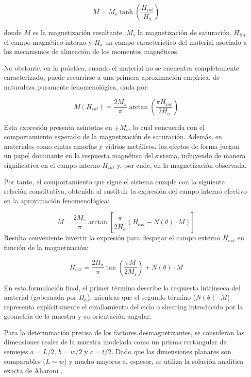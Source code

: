 $$ M = M_s \tanh\left( \frac{H_{int}}{H_a} \right) $$

donde $M$ es la magnetización resultante, $M_s$ la magnetización de saturación, $H_{int}$ el campo magnético interno y $H_a$ un campo característico del material asociado a los mecanismos de alineación de los momentos magnéticos.

No obstante, en la práctica, cuando el material no se encuentra completamente caracterizado, puede recurrirse a una primera aproximación empírica, de naturaleza puramente fenomenológica, dada por:

$$ M(H_{int}) = \frac{2 M_s}{\pi} \arctan\left( \frac{\pi H_{int}}{2 H_a} \right) $$

Esta expresión presenta asíntotas en $\pm M_s$, lo cual concuerda con el comportamiento esperado de la magnetización de saturación. Además, en materiales como cintas amorfas y vidrios metálicos, los efectos de forma juegan un papel dominante en la respuesta magnética del sistema, influyendo de manera significativa en el campo interno $H_{int}$ y, por ende, en la magnetización observada.

Por tanto, el comportamiento que sigue el sistema cumple con la siguiente relación constitutiva, obtenida al sustituir la expresión del campo interno efectivo en la aproximación fenomenológica:

\begin{equation}
    M = \frac{2 M_s}{\pi} \arctan\left[ \frac{\pi}{2 H_a} \left( H_{ext} - N(\theta) \cdot M \right) \right]
\end{equation}
Resulta conveniente invertir la expresión para despejar el campo externo $H_{ext}$ en función de la magnetización:

$$ H_{ext} = \frac{2 H_a}{\pi} \tan\left( \frac{\pi M}{2 M_s} \right) + N(\theta) \cdot M $$

En esta formulación final, el primer término describe la respuesta intrínseca del material (gobernada por $H_a$), mientras que el segundo término ($N(\theta) \cdot M$) representa explícitamente el cizallamiento del ciclo o shearing introducido por la geometría de la muestra y su orientación angular.


Para la determinación precisa de los factores desmagnetizantes, se consideran las dimensiones reales de la muestra modelada como un prisma rectangular de semiejes $a = L/2$, $b = w/2$ y $c = t/2$. Dado que las dimensiones planares son comparables ($L \sim w$) y mucho mayores al espesor, se utiliza la solución analítica exacta de Aharoni \cite{Aharoni1998}.

